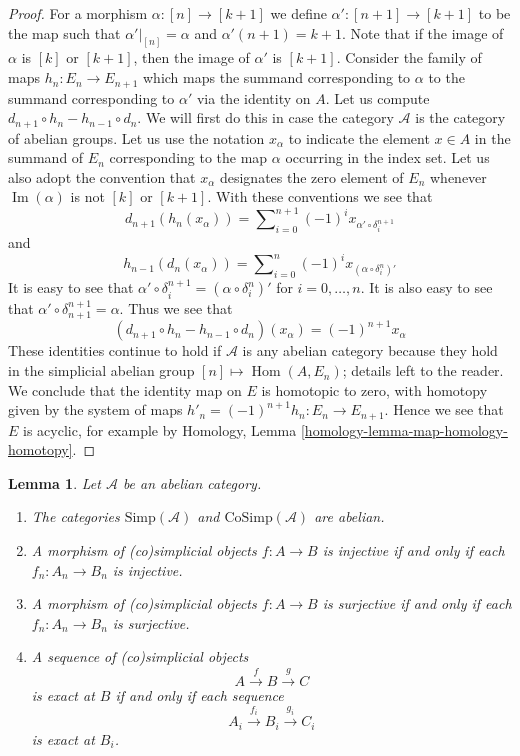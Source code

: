 \documentclass{stacks-project}
\theoremstyle{plain}
\newtheorem{lemma}[subsection]{Lemma}
\theoremstyle{definition}
\theoremstyle{remark}
\numberwithin{equation}{subsection}
\def\Hom{\mathop{\mathrm{Hom}}\nolimits}
\def\Im{\mathop{\mathrm{Im}}}
\begin{document}
\begin{proof}
For a morphism $\alpha : [n] \to [k + 1]$
we define $\alpha' : [n + 1] \to [k + 1]$ to be
the map such that $\alpha'|_{[n]} = \alpha$ and
$\alpha'(n + 1) = k + 1$. Note that if the
image of $\alpha$ is $[k]$ or $[k + 1]$, then
the image of $\alpha'$ is $[k + 1]$.
Consider the family of
maps $h_n : E_n \to E_{n + 1}$ which maps
the summand corresponding to $\alpha$ to
the summand corresponding to $\alpha'$ via
the identity on $A$.
Let us compute $d_{n + 1} \circ h_n - h_{n - 1} \circ d_n$.
We will first do this in case the category $\mathcal{A}$ is
the category of abelian groups.
Let us use the notation $x_\alpha$ to indicate
the element $x \in A$ in the summand of $E_n$ corresponding
to the map $\alpha$ occurring in the index set.
Let us also adopt the convention that
$x_\alpha$ designates the zero element of $E_n$
whenever $\Im(\alpha)$ is not $[k]$ or $[k + 1]$.
With these conventions we see that
$$
d_{n + 1}(h_n(x_\alpha)) =
\sum\nolimits_{i = 0}^{n + 1} (-1)^i x_{\alpha' \circ \delta^{n + 1}_i}
$$
and
$$
h_{n - 1}(d_n(x_\alpha)) =
\sum\nolimits_{i = 0}^n (-1)^i x_{(\alpha \circ \delta_i^n)'}
$$
It is easy to see that
$\alpha' \circ \delta^{n + 1}_i = (\alpha \circ \delta_i^n)'$
for $i = 0, \ldots, n$. It is also easy to see that
$\alpha' \circ \delta^{n + 1}_{n + 1} = \alpha$. Thus we
see that
$$
(d_{n + 1} \circ h_n - h_{n - 1} \circ d_n)(x_\alpha)
=
(-1)^{n + 1} x_\alpha
$$
These identities continue to hold if $\mathcal{A}$ is any abelian
category because they hold in the simplicial abelian group
$[n] \mapsto \Hom(A, E_n)$; details left to the reader.
We conclude that the identity map on $E$ is
homotopic to zero, with homotopy given by the
system of maps $h'_n = (-1)^{n + 1}h_n : E_n \to E_{n + 1}$.
Hence we see that $E$ is acyclic, for
example by Homology, Lemma \ref{homology-lemma-map-homology-homotopy}.
\end{proof}

\begin{lemma}
\label{lemma-abelian}
Let $\mathcal{A}$ be an abelian category.
\begin{enumerate}
\item The categories $\text{Simp}(\mathcal{A})$ and
$\text{CoSimp}(\mathcal{A})$ are abelian.
\item A morphism of (co)simplicial objects
$f : A \to B$ is injective
if and only if each $f_n : A_n \to B_n$ is injective.
\item A morphism of (co)simplicial objects
$f : A \to B$ is surjective
if and only if each $f_n : A_n \to B_n$ is surjective.
\item A sequence of (co)simplicial objects
$$
A \xrightarrow{f} B \xrightarrow{g} C
$$
is exact at $B$ if and only if each sequence
$$
A_i \xrightarrow{f_i} B_i \xrightarrow{g_i} C_i
$$
is exact at $B_i$.
\end{enumerate}
\end{lemma}
\end{document}
